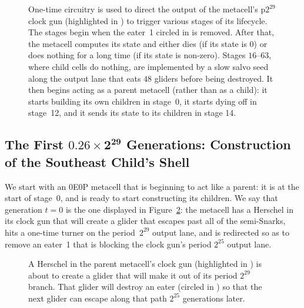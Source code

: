 \begin{figure}[!htbp]
	\centering
	\caption{One-time circuitry is used to direct the output of the metacell's p$2^{29}$ clock gun (highlighted in ) to trigger various stages of its lifecycle. The stages begin when the eater~1 circled in  is removed. After that, the metacell computes its state and either dies (if its state is 0) or does nothing for a long time (if its state is non-zero). Stages $16$--$63$, where child cells do nothing, are implemented by a slow salvo seed along the output lane that eats $48$ gliders before being destroyed. It then begins acting as a parent metacell (rather than as a child): it starts building its own children in stage~0, it starts dying off in stage~12, and it sends its state to its children in stage 14.}
	\label{fig:0e0p_clock_gun_full}
\end{figure}




\subsection{The First $\mathbf{0.26 \times 2^{29}}$ Generations: Construction of the Southeast Child's Shell}\label{sec:0e0p_timeline_shell}

We start with an 0E0P metacell that is beginning to act like a parent: it is at the start of stage~$0$, and is ready to start constructing its children. We say that generation $t = 0$ is the one displayed in Figure~\ref{fig:0e0p_timeline_0}: the metacell has a Herschel in its clock gun that will create a glider that escapes past all of the semi-Snarks, hits a one-time turner on the period~$2^{29}$ output lane, and is redirected so as to remove an eater~1 that is blocking the clock gun's period $2^{25}$ output lane.

\begin{figure}[!htb]
	\centering
	\caption{A Herschel in the parent metacell's clock gun (highlighted in ) is about to create a glider that will make it out of its period $2^{29}$ branch. That glider will destroy an eater (circled in ) so that the next glider can escape along that path $2^{25}$ generations later.}
	\label{fig:0e0p_timeline_0}
\end{figure}

